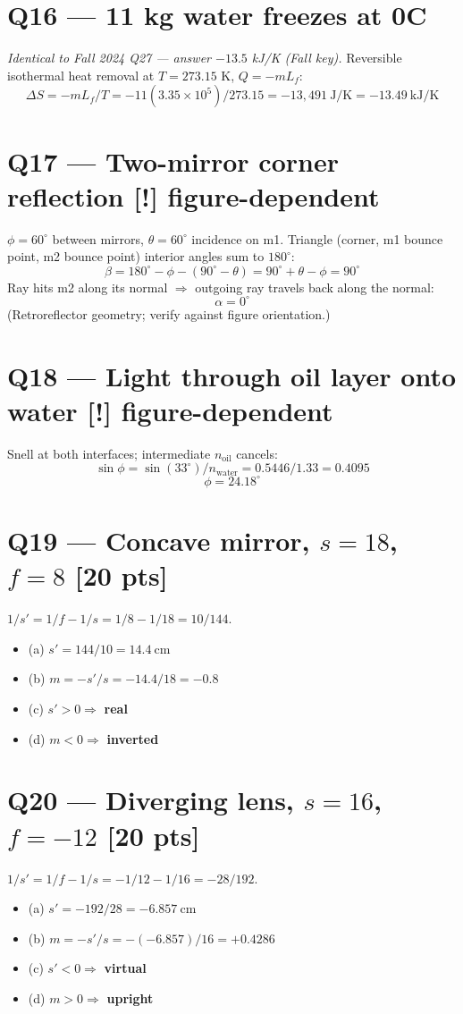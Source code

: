 \documentclass[11pt]{article}
\newcommand{\warn}{\textbf{[!]}}
\begin{document}
\section*{Q16 --- 11 kg water freezes at 0\textdegree C}
\emph{Identical to Fall 2024 Q27 --- answer $-13.5$ kJ/K (Fall key).} Reversible isothermal heat removal at $T=273.15$ K, $Q=-mL_f$:
\[ \Delta S = -mL_f/T = -11(3.35\times 10^5)/273.15 = -13{,}491\ \text{J/K} = \boxed{-13.49\ \text{kJ/K}} \]

\section*{Q17 --- Two-mirror corner reflection \warn{} figure-dependent}
$\phi=60^\circ$ between mirrors, $\theta=60^\circ$ incidence on m1. Triangle (corner, m1 bounce point, m2 bounce point) interior angles sum to $180^\circ$:
\[ \beta = 180^\circ - \phi - (90^\circ-\theta) = 90^\circ + \theta - \phi = 90^\circ \]
Ray hits m2 along its normal $\Rightarrow$ outgoing ray travels back along the normal:
\[ \alpha = \boxed{0^\circ} \]
(Retroreflector geometry; verify against figure orientation.)

\section*{Q18 --- Light through oil layer onto water \warn{} figure-dependent}
Snell at both interfaces; intermediate $n_{\text{oil}}$ cancels:
\[ \sin\phi = \sin(33^\circ)/n_{\text{water}} = 0.5446/1.33 = 0.4095 \]
\[ \phi = \boxed{24.18^\circ} \]

\section*{Q19 --- Concave mirror, $s=18$, $f=8$ [20 pts]}
$1/s' = 1/f - 1/s = 1/8 - 1/18 = 10/144$.
\begin{itemize}[leftmargin=*]
  \item (a) $s' = 144/10 = \boxed{14.4\ \text{cm}}$
  \item (b) $m = -s'/s = -14.4/18 = \boxed{-0.8}$
  \item (c) $s'>0 \Rightarrow$ \textbf{real}
  \item (d) $m<0 \Rightarrow$ \textbf{inverted}
\end{itemize}

\section*{Q20 --- Diverging lens, $s=16$, $f=-12$ [20 pts]}
$1/s' = 1/f - 1/s = -1/12 - 1/16 = -28/192$.
\begin{itemize}[leftmargin=*]
  \item (a) $s' = -192/28 = \boxed{-6.857\ \text{cm}}$
  \item (b) $m = -s'/s = -(-6.857)/16 = \boxed{+0.4286}$
  \item (c) $s'<0 \Rightarrow$ \textbf{virtual}
  \item (d) $m>0 \Rightarrow$ \textbf{upright}
\end{itemize}
\end{document}

